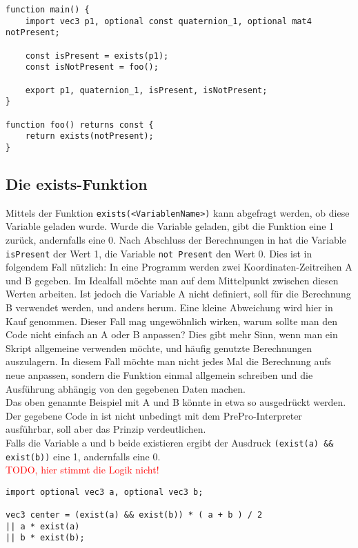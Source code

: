 \begin{lstlisting}[language=prepro, label={lst:OptionalImport}, caption={PrePro-Code mit optionalen Imports}, captionpos=b]
function main() {
	import vec3 p1, optional const quaternion_1, optional mat4 notPresent;

	const isPresent = exists(p1);
	const isNotPresent = foo();

	export p1, quaternion_1, isPresent, isNotPresent;
}

function foo() returns const {
	return exists(notPresent);
}
\end{lstlisting}

\subsection{Die exists-Funktion}
Mittels der Funktion \texttt{exists(<VariablenName>)} kann abgefragt werden, ob diese Variable geladen wurde.
Wurde die Variable geladen, gibt die Funktion eine 1 zurück, andernfalls eine 0.
Nach Abschluss der Berechnungen in  hat die Variable \texttt{isPresent} der Wert 1, die Variable \texttt{not Present} den Wert 0.
Dies ist in folgendem Fall nützlich:
In eine Programm werden zwei Koordinaten-Zeitreihen A und B gegeben.
Im Idealfall möchte man auf dem Mittelpunkt zwischen diesen Werten arbeiten.
Ist jedoch die Variable A nicht definiert, soll für die Berechnung B verwendet werden, und anders herum.
Eine kleine Abweichung wird hier in Kauf genommen.
Dieser Fall mag ungewöhnlich wirken, warum sollte man den Code nicht einfach an A oder B anpassen?
Dies gibt mehr Sinn, wenn man ein Skript allgemeine verwenden möchte, und häufig genutzte Berechnungen auszulagern.
In diesem Fall möchte man nicht jedes Mal die Berechnung aufs neue anpassen, sondern die Funktion einmal allgemein schreiben und die Ausführung abhängig von den gegebenen Daten machen.\\
Das oben genannte Beispiel mit A und B könnte in etwa so ausgedrückt werden.
Der gegebene Code in  ist nicht unbedingt mit dem PrePro-Interpreter ausführbar, soll aber das Prinzip verdeutlichen.\\
Falls die Variable a und b beide existieren ergibt der Ausdruck \texttt{(exist(a) \&\& exist(b))} eine 1, andernfalls eine 0.\\
\textcolor{red}{TODO, hier stimmt die Logik nicht!}

\begin{lstlisting}[language=prepro, label={lst:OptionalImportExample}, caption={PrePro-Code mit optionalen Imports}, captionpos=b]
import optional vec3 a, optional vec3 b;

vec3 center = (exist(a) && exist(b)) * ( a + b ) / 2
|| a * exist(a)
|| b * exist(b);
\end{lstlisting}

